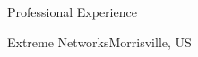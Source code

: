 \documentclass{resume} %
\begin{document}
\begin{rSection}{Professional Experience}
\begin{rSubsectionCompany}{Extreme Networks}{Morrisville, US}
\begin{comment}
                \item Initiate Python3 support for RESTCONF project.
                \item Migrate RESTCONF project from gitolite to github.
                \item Add OpenAPI infrastructure to EXOS.
                \item Python library management - replace deprecated/active-CVE library with new ones. Upgrade to newer library versions.
                \item Python extension improvement, refactor, maintenance.
                \item Features for restconf - compression, json formatting, filtering capabilities.
                \item Troubleshooting tech transfer - Unified licensing project: EXOS License Manager i.e., Developed user interface and trained GTAC on troubleshooting SE's License manager for the unified licensing project as part of the infrastructure team.
                \item Played the lead role in python migration project by initiating discussions to run Switch Engine's python infrastructure on v3.8 instead of the obsolete v2.7, in addition to planning the project itinerary and resource requirement.
                
                \item Responsible to facilitate the migration of customers from switches that run on EOS to be powered by EXOS. 
                \item Required understanding the workflow of a customer configuring the networking equipment in the field and perceive the set of important features that was missing from EOS environment in the EXOS system. Then, along with this information I was required to prioritize and select the feature to implement based on the customer requests and company's long-term goals.
    

\end{comment}
\end{rSubsectionCompany}
\end{rSection}
\end{document}
